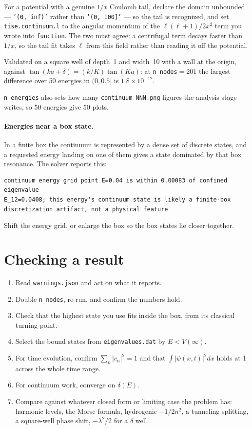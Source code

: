 \documentclass[11pt]{article}
\newcommand{\file}[1]{\texttt{#1}}
\begin{document}
For a potential with a genuine $1/x$ Coulomb tail, declare the domain unbounded
--- \texttt{'(0, inf)'} rather than \texttt{'(0, 100]'} --- so the tail is
recognized, and set \texttt{tise.continuum.l} to the angular momentum of the
$\ell(\ell+1)/2x^{2}$ term you wrote into \texttt{function}. The two must agree:
a centrifugal term decays faster than $1/x$, so the tail fit takes $\ell$ from
this field rather than reading it off the potential.

Validated on a square well of depth~1 and width~10 with a wall at the origin,
against $\tan(ka+\delta) = (k/K)\tan(Ka)$: at \texttt{n\_nodes}${}=201$ the
largest difference over 50 energies in $(0, 0.5]$ is $1.8\times10^{-12}$.

\texttt{n\_energies} also sets how many \file{continuum\_NNN.png} figures the
analysis stage writes, so 50 energies give 50 plots.

\paragraph{Energies near a box state.} In a finite box the continuum is
represented by a dense set of discrete states, and a requested energy landing on
one of them gives a state dominated by that box resonance. The solver reports
this:
\begin{lstlisting}[style=sh]
continuum energy grid point E=0.04 is within 0.00083 of confined eigenvalue
E_12=0.0408; this energy's continuum state is likely a finite-box
discretization artifact, not a physical feature
\end{lstlisting}
Shift the energy grid, or enlarge the box so the box states lie closer
together.

\section{Checking a result}

\begin{enumerate}[leftmargin=1.5em]
\item Read \file{warnings.json} and act on what it reports.
\item Double \texttt{n\_nodes}, re-run, and confirm the numbers hold.
\item Check that the highest state you use fits inside the box, from its
      classical turning point.
\item Select the bound states from \file{eigenvalues.dat} by $E < V(\infty)$.
\item For time evolution, confirm $\sum_n |c_n|^{2} = 1$ and that
      $\int|\psi(x,t)|^{2}dx$ holds at 1 across the whole time range.
\item For continuum work, converge on $\delta(E)$.
\item Compare against whatever closed form or limiting case the problem has:
      harmonic levels, the Morse formula, hydrogenic $-1/2n^{2}$, a tunneling
      splitting, a square-well phase shift, $-\lambda^{2}/2$ for a $\delta$
      well.
\end{enumerate}
\end{document}
